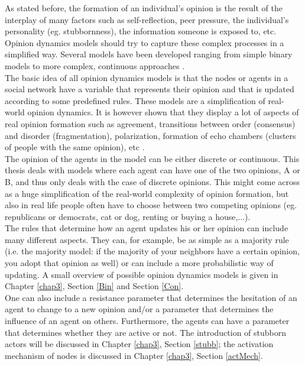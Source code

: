 \documentclass[11 pt , letterpaper , twoside , openright]{book}
\begin{document}
As stated before, the formation of an individual's opinion is the result of the interplay of many factors such as self-reflection, peer pressure, the individual's personality (eg. stubbornness), the information someone is exposed to, etc.  Opinion dynamics models should try to capture these complex processes in a simplified way. Several models have been developed ranging from simple binary models to more complex, continuous approaches \cite{Sirbu2016}.\\
\newline
The basic idea of all opinion dynamics models is that the nodes or agents in a social network have a variable that represents their opinion and that is updated according to some predefined rules. These models are a simplification of real-world opinion dynamics. It is however shown that they display a lot of aspects of real opinion formation such as agreement, transitions between order (consensus) and disorder (fragmentation), polarization, formation of echo chambers (clusters of people with the same opinion), etc \cite{Sirbu2016}. \\
\newline
The opinion of the agents in the model can be either discrete or continuous. This thesis deals with models where each agent can have one of the two opinions, A or B, and thus only deals with the case of discrete opinions. This might come across as a huge simplification of the real-world complexity of opinion formation, but also in real life people often have to choose between two competing opinions (eg. republicans or democrats, cat or dog, renting or buying a house,...). \\
\newline
The rules that determine how an agent updates his or her opinion can include many different aspects. They can, for example, be as simple as a majority rule (i.e. the majority model: if the majority of your neighbors have a certain opinion, you adopt that opinion as well) or can include a more probabilistic way of updating. A small overview of possible opinion dynamics models is given in Chapter \ref{chap3}, Section \ref{Bin} and Section \ref{Con}. \\
\newline
One can also include a resistance parameter that determines the hesitation of an agent to change to a new opinion and/or a parameter that determines the influence of an agent on others. Furthermore, the agents can have a parameter that determines whether they are active or not. The introduction of stubborn actors will be discussed in Chapter \ref{chap3}, Section \ref{stubb}; the activation mechanism of nodes is discussed in Chapter \ref{chap3}, Section \ref{actMech}.\\
\end{document}
